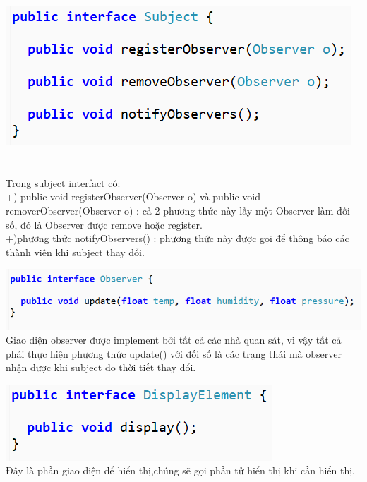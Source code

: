 \begin{multicols}{2}
	\includegraphics[width=1\columnwidth]{GALLEYS/images/chapter2/images1}\\\\\\
	Trong subject interfact có:\\
	+) public void registerObserver(Observer o) và public void removerObserver(Observer o) : cả 2 phương thức này lấy một Observer làm đối số, đó là Observer được remove hoặc register.\\
	+)phương thức notifyObservers() : phương thức này được gọi để thông báo các thành viên khi subject thay đổi.
\end{multicols}
	\includegraphics{GALLEYS/images/chapter2/images2}\\
	Giao diện observer được implement bởi tất cả các nhà quan sát, vì vậy tất cả phải thực hiện phương thức update() với đối số là các trạng thái mà observer nhận được khi subject đo thời tiết thay đổi.
\begin{multicols}{2}
	\includegraphics{GALLEYS/images/chapter2/images3}\\
	Đây là phần giao diện để hiển thị,chúng sẽ gọi phần tử hiển thị khi cần hiển thị.
\end{multicols}
